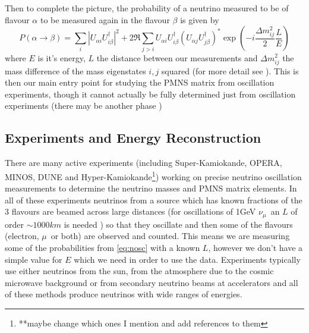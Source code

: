 \documentclass[a4paper,12pt]{article}
\newcommand{\Mu}{$\mu$}
\newcommand{\Nm}{$\nu_\mu$}
\begin{document}
Then to complete the picture, the probability of a neutrino measured to be of flavour $\alpha$ to be measured again in the flavour $\beta$ is given by 
\begin{equation} \label{eq:nosc}
    P(\alpha \rightarrow \beta) = \sum_i |U_{\alpha i} U^\dag_{i \beta}|^2 + 2\Re \sum_{j>i} U_{\alpha i} U^\dag_{i \beta} (U_{\alpha j} U^\dag_{j \beta})^* \exp(-i\frac{\Delta m^2_{ij}}{2}\frac{L}{E})
\end{equation}
where $E$ is it's energy, $L$ the distance between our measurements and $\Delta m^2_{ij}$ the mass difference of the mass eigenstates $i, j$ squared (for more detail see \cite{zuberNeutrinoPhysics2020}).
This is then our main entry point for studying the PMNS matrix from oscillation experiments, though it cannot actually be fully determined just from oscillation experiments (there may be another phase )

\subsection{Experiments and Energy Reconstruction}\label{sec:exanderec}
There are many active experiments (including Super-Kamiokande, OPERA, MINOS, DUNE and Hyper-Kamiokande\footnote{**maybe change which ones I mention and add references to them}) working on precise neutrino oscillation measurements to determine the neutrino masses and PMNS matrix elements.
In all of these experiments neutrinos from a source which has known fractions of the 3 flavours are beamed across large distances (for oscillations of 1\si{GeV} \Nm\ an $L$ of order $\sim 1000\si{km}$ is needed \cite{mezzettoThreeFlavorOscillationsAccelerator2020}) so that they oscillate and then some of the flavours (electron, \Mu\ or both) are observed and counted.
This means we are measuring some of the probabilities from \cref{eq:nosc} with a known $L$, however we don't have a simple value for $E$ which we need in order to use the data.
Experiments typically use either neutrinos from the sun, from the atmosphere due to the cosmic microwave background or from secondary neutrino beams at accelerators and all of these methods produce neutrinos with wide ranges of energies.
\end{document}
